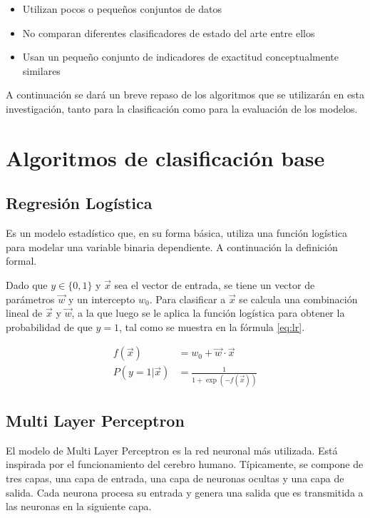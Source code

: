 \begin{itemize}
	\item Utilizan pocos o pequeños conjuntos de datos
	\item No comparan diferentes clasificadores de estado del arte entre ellos
	\item Usan un pequeño conjunto de indicadores de exactitud conceptualmente similares
\end{itemize}

A continuación se dará un breve repaso de los algoritmos que se utilizarán en esta investigación, tanto para la clasificación como para la evaluación de los modelos.

\section{Algoritmos de clasificación base}

\subsection{Regresión Logística}

Es un modelo estadístico que, en su forma básica, utiliza una función logística para modelar una variable binaria dependiente. A continuación la definición formal.

Dado que $y\in \{0, 1\}$ y $\vec{x}$ sea el vector de entrada, se tiene un vector de parámetros $\vec{w}$ y un intercepto $w_0$. Para clasificar a $\vec{x}$ se calcula una combinación lineal de $\vec{x}$ y $\vec{w}$, a la que luego se le aplica la función logística para obtener la probabilidad de que $y = 1$, tal como se muestra en la fórmula \ref{eq:lr}.

\begin{equation}
	\label{eq:lr}
\begin{split}
	f(\vec{x}) &= w_0 + \vec{w}\cdot\vec{x} \\
	P(y=1|\vec{x}) &= \frac{1}{1 + \exp(-f(\vec{x})) }
\end{split}
\end{equation}

\subsection{Multi Layer Perceptron}

El modelo de Multi Layer Perceptron es la red neuronal más utilizada. Está inspirada por el funcionamiento del cerebro humano. Típicamente, se compone de tres capas, una capa de entrada, una capa de neuronas ocultas y una capa de salida. Cada neurona procesa su entrada y genera una salida que es transmitida a las neuronas en la siguiente capa.

